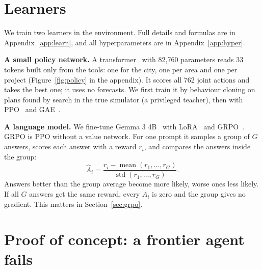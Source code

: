\documentclass{article}
\begin{document}
\section{Learners}\label{sec:learn}

We train two learners in the environment. Full details and formulas are in Appendix~\ref{app:learn}, and all hyperparameters are in Appendix~\ref{app:hyper}.

\textbf{A small policy network.} A transformer~\cite{vaswani2017} with 82{,}760 parameters reads 33 tokens built only from the tools: one for the city, one per area and one per project (Figure~\ref{fig:policy} in the appendix). It scores all 762 joint actions and takes the best one; it uses no forecasts. We first train it by behaviour cloning on plans found by search in the true simulator (a privileged teacher), then with PPO~\cite{schulman2017} and GAE~\cite{schulman2016}.

\textbf{A language model.} We fine-tune Gemma 3 4B~\cite{gemmateam2025} with LoRA~\cite{hu2022} and GRPO~\cite{shao2024,guo2025}. GRPO is PPO without a value network. For one prompt it samples a group of $G$ answers, scores each answer with a reward $r_i$, and compares the answers inside the group:
\begin{equation}\label{eq:grpoadv}
\hat A_{i}=\frac{r_i-\operatorname{mean}(r_1,\dots,r_G)}{\operatorname{std}(r_1,\dots,r_G)}.
\end{equation}
Answers better than the group average become more likely, worse ones less likely. If all $G$ answers get the same reward, every $\hat A_i$ is zero and the group gives no gradient. This matters in Section~\ref{sec:grpo}.

\section{Proof of concept: a frontier agent fails}\label{sec:poc}
\end{document}
